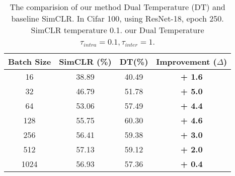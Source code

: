 \begin{table}
    \centering
    \begin{tabular}{@{}cccc@{}}
    \toprule
    Batch Size & SimCLR (\%) & DT(\%) & Improvement ($\Delta$) \\
    \midrule
    16 & 38.89 & 40.49 & \textbf{+ 1.6} \\
    32 & 46.79 & 51.78 & \textbf{+ 5.0} \\
    64 & 53.06 & 57.49 & \textbf{+ 4.4}\\
    128 & 55.75 & 60.30 & \textbf{+ 4.6} \\
    256 & 56.41 & 59.38 & \textbf{+ 3.0} \\
    512 & 57.13 & 59.12 & \textbf{+ 2.0} \\
    1024 & 56.93 & 57.36 & \textbf{+ 0.4} \\
    \bottomrule
    \end{tabular}
    \caption{
    The comparision of our method Dual Temperature (DT) and baseline SimCLR. In Cifar 100, using ResNet-18, epoch 250. SimCLR temperature 0.1. our Dual Temperature $\tau_{intra} = 0.1, \tau_{inter} = 1$.
    } %
    \label{tab:sota1}
\end{table}
